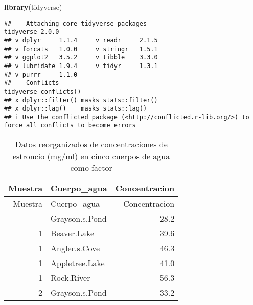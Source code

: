 \documentclass[
]{article}
\newenvironment{Shaded}{\begin{snugshade}}{\end{snugshade}}
\newcommand{\AttributeTok}[1]{\textcolor[rgb]{0.13,0.29,0.53}{#1}}
\newcommand{\CommentTok}[1]{\textcolor[rgb]{0.56,0.35,0.01}{\textit{#1}}}
\newcommand{\FunctionTok}[1]{\textcolor[rgb]{0.13,0.29,0.53}{\textbf{#1}}}
\newcommand{\NormalTok}[1]{#1}
\newcommand{\OtherTok}[1]{\textcolor[rgb]{0.56,0.35,0.01}{#1}}
\newcommand{\SpecialCharTok}[1]{\textcolor[rgb]{0.81,0.36,0.00}{\textbf{#1}}}
\newcommand{\StringTok}[1]{\textcolor[rgb]{0.31,0.60,0.02}{#1}}
\begin{document}
\begin{Shaded}
\begin{Highlighting}[]
\FunctionTok{library}\NormalTok{(tidyverse)}
\end{Highlighting}
\end{Shaded}

\begin{verbatim}
## -- Attaching core tidyverse packages ------------------------ tidyverse 2.0.0 --
## v dplyr     1.1.4     v readr     2.1.5
## v forcats   1.0.0     v stringr   1.5.1
## v ggplot2   3.5.2     v tibble    3.3.0
## v lubridate 1.9.4     v tidyr     1.3.1
## v purrr     1.1.0     
## -- Conflicts ------------------------------------------ tidyverse_conflicts() --
## x dplyr::filter() masks stats::filter()
## x dplyr::lag()    masks stats::lag()
## i Use the conflicted package (<http://conflicted.r-lib.org/>) to force all conflicts to become errors
\end{verbatim}

\begin{Shaded}
\end{Shaded}

\begin{longtable}[]{@{}rlr@{}}
\caption{Datos reorganizados de concentraciones de estroncio (mg/ml) en
cinco cuerpos de agua como factor}\tabularnewline
\toprule\noalign{}
Muestra & Cuerpo\_agua & Concentracion \\
\midrule\noalign{}
\endfirsthead
\toprule\noalign{}
Muestra & Cuerpo\_agua & Concentracion \\
\midrule\noalign{}
\endhead
\bottomrule\noalign{}
\endlastfoot
1 & Grayson.s.Pond & 28.2 \\
1 & Beaver.Lake & 39.6 \\
1 & Angler.s.Cove & 46.3 \\
1 & Appletree.Lake & 41.0 \\
1 & Rock.River & 56.3 \\
2 & Grayson.s.Pond & 33.2 \\
\end{longtable}
\end{document}
